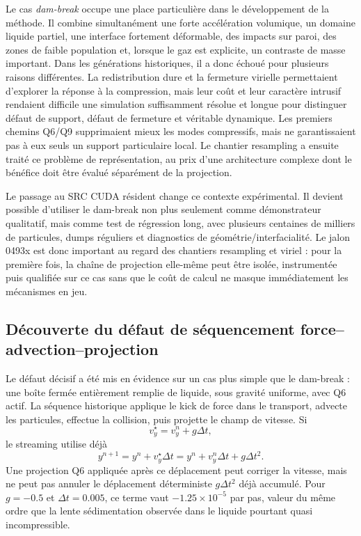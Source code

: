 \documentclass[11pt,a4paper]{article}
\begin{document}
Le cas \emph{dam-break} occupe une place particulière dans le développement de la méthode. Il combine simultanément une forte accélération volumique, un domaine liquide partiel, une interface fortement déformable, des impacts sur paroi, des zones de faible population et, lorsque le gaz est explicite, un contraste de masse important. Dans les générations historiques, il a donc échoué pour plusieurs raisons différentes. La redistribution dure et la fermeture virielle permettaient d'explorer la réponse à la compression, mais leur coût et leur caractère intrusif rendaient difficile une simulation suffisamment résolue et longue pour distinguer défaut de support, défaut de fermeture et véritable dynamique. Les premiers chemins Q6/Q9 supprimaient mieux les modes compressifs, mais ne garantissaient pas à eux seuls un support particulaire local. Le chantier resampling a ensuite traité ce problème de représentation, au prix d'une architecture complexe dont le bénéfice doit être évalué séparément de la projection.

Le passage au SRC CUDA résident change ce contexte expérimental. Il devient possible d'utiliser le dam-break non plus seulement comme démonstrateur qualitatif, mais comme test de régression long, avec plusieurs centaines de milliers de particules, dumps réguliers et diagnostics de géométrie/interfacialité. Le jalon 0493x est donc important au regard des chantiers resampling et viriel : pour la première fois, la chaîne de projection elle-même peut être isolée, instrumentée puis qualifiée sur ce cas sans que le coût de calcul ne masque immédiatement les mécanismes en jeu.

\subsection{Découverte du défaut de séquencement force--advection--projection}

Le défaut décisif a été mis en évidence sur un cas plus simple que le dam-break : une boîte fermée entièrement remplie de liquide, sous gravité uniforme, avec Q6 actif. La séquence historique applique le kick de force dans le transport, advecte les particules, effectue la collision, puis projette le champ de vitesse. Si
\begin{equation}
  v_y^{\star}=v_y^n+g\Delta t,
\end{equation}
le streaming utilise déjà
\begin{equation}
  y^{n+1}=y^n+v_y^{\star}\Delta t
  =y^n+v_y^n\Delta t+g\Delta t^2.
\end{equation}
Une projection Q6 appliquée après ce déplacement peut corriger la vitesse, mais ne peut pas annuler le déplacement déterministe $g\Delta t^2$ déjà accumulé. Pour $g=-0.5$ et $\Delta t=0.005$, ce terme vaut $-1.25\times10^{-5}$ par pas, valeur du même ordre que la lente sédimentation observée dans le liquide pourtant quasi incompressible.
\end{document}

